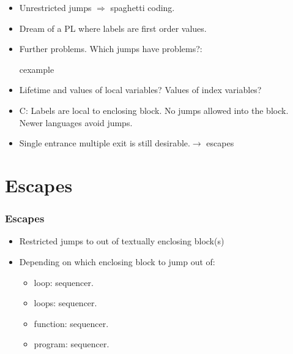 \begin{frame}
\begin{itemize}
\item Unrestricted jumps $\Rightarrow$ spaghetti coding.
\item Dream of a PL where labels are first order values. \smiley
\item Further problems. Which jumps have problems?:
\begin{beamercolorbox}{cexample}
\codejumpblock
\end{beamercolorbox}
\item Lifetime and values of local variables? Values of index variables?
\item C: Labels are local to enclosing block. No jumps allowed into the block.
Newer languages avoid jumps.
\item Single entrance multiple exit is still desirable.$\rightarrow$ escapes
\end{itemize}
\end{frame}

\section{Escapes}
\begin{frame}
\frametitle{Escapes}
\begin{itemize}
\item  Restricted jumps to out of textually enclosing block(s)
\item Depending on which enclosing block to jump out of:
\begin{itemize}
\item loop:  sequencer.
\item loops:  sequencer.
\item function:  sequencer.
\item program:  sequencer.
\end{itemize}
\end{itemize}
\end{frame}

